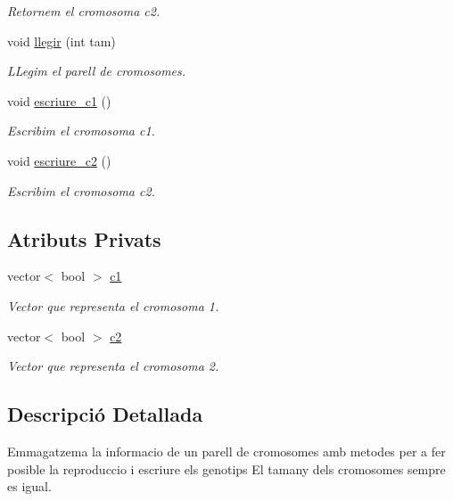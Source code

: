 \begin{DoxyCompactItemize}
\begin{DoxyCompactList}\small\item\em Retornem el cromosoma c2. \end{DoxyCompactList}\item 
void \hyperlink{classparell__cromosomes_a3217cc5eb83e77521b28f091c7cf5a5a}{llegir} (int tam)
\begin{DoxyCompactList}\small\item\em L\+Legim el parell de cromosomes. \end{DoxyCompactList}\item 
void \hyperlink{classparell__cromosomes_a1bd9e226b1fe9d3e02302e9230c8b928}{escriure\+\_\+c1} ()
\begin{DoxyCompactList}\small\item\em Escribim el cromosoma c1. \end{DoxyCompactList}\item 
void \hyperlink{classparell__cromosomes_a109c96b0eb5e9c63ec97fa0b1e62c252}{escriure\+\_\+c2} ()
\begin{DoxyCompactList}\small\item\em Escribim el cromosoma c2. \end{DoxyCompactList}\end{DoxyCompactItemize}
\subsection*{Atributs Privats}
\begin{DoxyCompactItemize}
\item 
vector$<$ bool $>$ \hyperlink{classparell__cromosomes_ab4d7cfc40f53a1698b4ea3ef1f2cd199}{c1}
\begin{DoxyCompactList}\small\item\em Vector que representa el cromosoma 1. \end{DoxyCompactList}\item 
vector$<$ bool $>$ \hyperlink{classparell__cromosomes_a888f09ecbc3329b0ee505fb0cb8bf98f}{c2}
\begin{DoxyCompactList}\small\item\em Vector que representa el cromosoma 2. \end{DoxyCompactList}\end{DoxyCompactItemize}


\subsection{Descripció Detallada}
Emmagatzema la informacio de un parell de cromosomes amb metodes per a fer posible la reproduccio i escriure els genotips El tamany dels cromosomes sempre es igual. 

